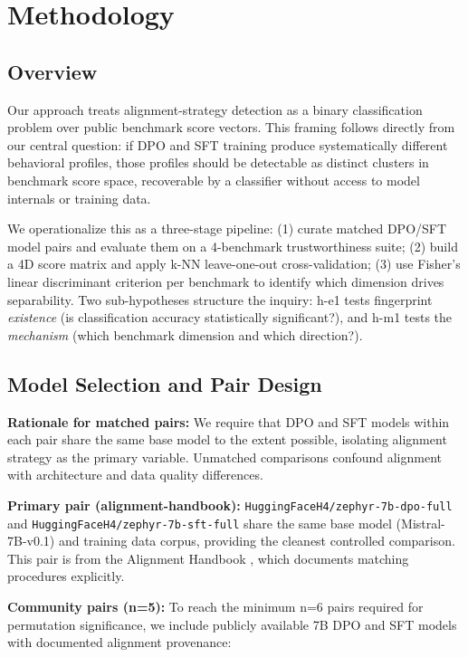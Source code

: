 \section{Methodology}
\label{sec:method}

\subsection{Overview}

Our approach treats alignment-strategy detection as a binary classification problem over
public benchmark score vectors. This framing follows directly from our central question:
if DPO and SFT training produce systematically different behavioral profiles, those
profiles should be detectable as distinct clusters in benchmark score space, recoverable
by a classifier without access to model internals or training data.

We operationalize this as a three-stage pipeline: (1) curate matched DPO/SFT model
pairs and evaluate them on a 4-benchmark trustworthiness suite; (2) build a 4D score
matrix and apply k-NN leave-one-out cross-validation; (3) use Fisher's linear discriminant
criterion per benchmark to identify which dimension drives separability. Two sub-hypotheses
structure the inquiry: h-e1 tests fingerprint \textit{existence} (is classification accuracy
statistically significant?), and h-m1 tests the \textit{mechanism} (which benchmark dimension
and which direction?).

\subsection{Model Selection and Pair Design}

\textbf{Rationale for matched pairs:} We require that DPO and SFT models within each pair
share the same base model to the extent possible, isolating alignment strategy as the
primary variable. Unmatched comparisons confound alignment with architecture and data
quality differences.

\textbf{Primary pair (alignment-handbook):} \texttt{HuggingFaceH4/zephyr-7b-dpo-full} and
\texttt{HuggingFaceH4/zephyr-7b-sft-full} share the same base model (Mistral-7B-v0.1) and
training data corpus, providing the cleanest controlled comparison. This pair is from
the Alignment Handbook \cite{Tunstall2023Zephyr}, which documents matching procedures
explicitly.

\textbf{Community pairs (n=5):} To reach the minimum n=6 pairs required for permutation
significance, we include publicly available 7B DPO and SFT models with documented
alignment provenance:

